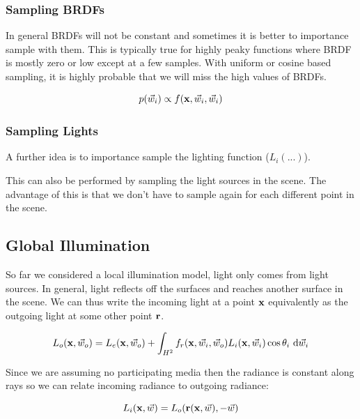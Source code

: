 \documentclass{article}
\begin{document}
\subsubsection{Sampling BRDFs}

In general BRDFs will not be constant and sometimes it is better to importance sample with them. This is typically true for
highly peaky functions where BRDF is mostly zero or low except at a few samples. With uniform or cosine based sampling, it is
highly probable that we will miss the high values of BRDFs.

\[
    p(\vec{w}_i) \propto f(\text{\textbf{x}}, \vec{w}_i, \vec{w}_i)
\]

\vspace{20px}

\subsubsection{Sampling Lights}

A further idea is to importance sample the lighting function (\(L_i(...)\)).

\vspace{5px}

This can also be performed by sampling the light sources in the scene. The advantage of this is that we don't have to sample again for each
different point in the scene.

\vspace{50px}

\subsection{Global Illumination}

So far we considered a local illumination model, light only comes from light sources. In general, light reflects off the surfaces and 
reaches another surface in the scene. We can thus write the incoming light at a point \(\text{\textbf{x}}\) equivalently as the outgoing
light at some other point \(\text{\textbf{r}}\).

\[
    L_o(\text{\textbf{x}}, \vec{w}_o) = L_e(\text{\textbf{x}}, \vec{w}_o) + \int_{H^2} f_r(\text{\textbf{x}}, \vec{w}_i, \vec{w}_o) L_i(\text{\textbf{x}}, \vec{w}_i) \cos \theta_i \ \text{d}\vec{w}_i
\]

Since we are assuming no participating media then the radiance is constant along rays so we can relate incoming radiance to outgoing radiance:

\[
    L_i(\text{\textbf{x}}, \vec{w}) = L_o(\text{\textbf{r}}(\text{\textbf{x}}, \vec{w}), -\vec{w})
\]
\end{document}
